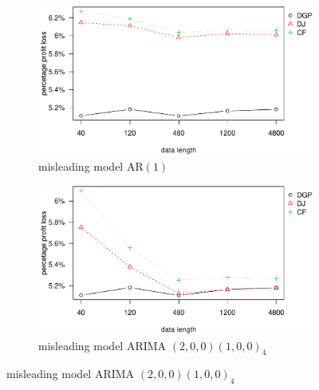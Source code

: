 \documentclass{article}
\begin{document}
\begin{figure}[ht]
\centering
\caption{Percentage profit loss vs. data size in misleading model}
\begin{subfigure}[b]{0.48\textwidth}
\centering
\includegraphics[width=\textwidth]{information-plot_files/figure-latex/AR(1)-1.pdf}
\caption{misleading model AR$(1)$}
\end{subfigure}
\hfill
\begin{subfigure}[b]{0.48\textwidth}
\centering
\includegraphics[width=\textwidth]{information-plot_files/figure-latex/SAR(3)(1)_4-1.pdf}
\caption{misleading model ARIMA $(2,0,0)(1,0,0)_4$}
\end{subfigure}
\label{fig:mis}
\end{figure}
\end{document}
